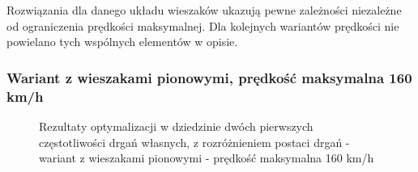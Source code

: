 Rozwiązania dla danego układu wieszaków ukazują pewne zależności niezależne od ograniczenia prędkości maksymalnej. Dla kolejnych wariantów prędkości nie powielano tych wspólnych elementów w opisie.

%		



\clearpage

\subsubsection{Wariant z wieszakami pionowymi, prędkość maksymalna 160 km/h}
\begin{figure}[H]
	\centering
\end{figure}
\begin{figure}[H]\ContinuedFloat
	\centering
\end{figure}
\begin{figure}[H]\ContinuedFloat
	\centering
	\label{fig:opti_res_2_freqs_prost_160_e1}
	\caption{Rezultaty optymalizacji w dziedzinie dwóch pierwszych częstotliwości drgań własnych, z rozróżnieniem postaci drgań - wariant z wieszakami pionowymi - prędkość maksymalna 160 km/h}
	\label{fig:opti_res_2_freqs_prost_160}
\end{figure}
